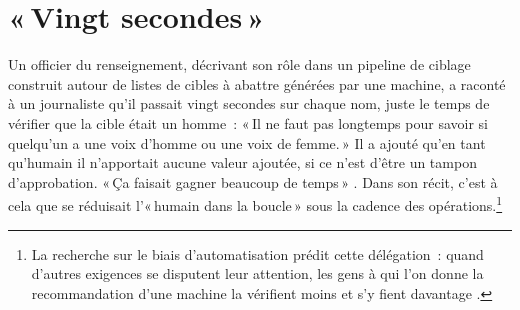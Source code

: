 \chapter{«\,Vingt secondes\,»}
\label{sec:1}
Un officier du renseignement, décrivant son rôle dans un pipeline de ciblage construit autour de listes de cibles à abattre générées par une machine, a raconté à un journaliste qu'il passait vingt secondes sur chaque nom, juste le temps de vérifier que la cible était un homme~: «\,Il ne faut pas longtemps pour savoir si quelqu'un a une voix d'homme ou une voix de femme.\,» Il a ajouté qu'en tant qu'humain il n'apportait aucune valeur ajoutée, si ce n'est d'être un tampon d'approbation. «\,Ça faisait gagner beaucoup de temps\,» \autocite{abraham2024lavender}. Dans son récit, c'est à cela que se réduisait l'«\,humain dans la boucle\,» sous la cadence des opérations.\footnote{La recherche sur le biais d'automatisation prédit cette délégation~: quand d'autres exigences se disputent leur attention, les gens à qui l'on donne la recommandation d'une machine la vérifient moins et s'y fient davantage \autocite{parasuraman2010complacency}.}

